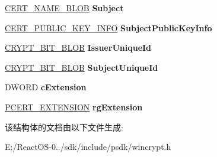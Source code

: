 \begin{DoxyCompactItemize}
\hyperlink{struct___c_r_y_p_t_o_a_p_i___b_l_o_b}{C\+E\+R\+T\+\_\+\+N\+A\+M\+E\+\_\+\+B\+L\+OB} {\bfseries Subject}
\item 
\mbox{\label{struct___c_e_r_t___i_n_f_o_a94044bc448978413437e7eecadebdc6c}} 
\hyperlink{struct___c_e_r_t___p_u_b_l_i_c___k_e_y___i_n_f_o}{C\+E\+R\+T\+\_\+\+P\+U\+B\+L\+I\+C\+\_\+\+K\+E\+Y\+\_\+\+I\+N\+FO} {\bfseries Subject\+Public\+Key\+Info}
\item 
\mbox{\label{struct___c_e_r_t___i_n_f_o_af4152705b0068616b0892478abaedad3}} 
\hyperlink{struct___c_r_y_p_t___b_i_t___b_l_o_b}{C\+R\+Y\+P\+T\+\_\+\+B\+I\+T\+\_\+\+B\+L\+OB} {\bfseries Issuer\+Unique\+Id}
\item 
\mbox{\label{struct___c_e_r_t___i_n_f_o_a6c4c9f8ab6c76878cbb9ae0439f2c734}} 
\hyperlink{struct___c_r_y_p_t___b_i_t___b_l_o_b}{C\+R\+Y\+P\+T\+\_\+\+B\+I\+T\+\_\+\+B\+L\+OB} {\bfseries Subject\+Unique\+Id}
\item 
\mbox{\label{struct___c_e_r_t___i_n_f_o_ae176d129359560fdc7727f434a778c44}} 
D\+W\+O\+RD {\bfseries c\+Extension}
\item 
\mbox{\label{struct___c_e_r_t___i_n_f_o_a0c3ffcc22f46963abae3a22a2a75dc8e}} 
\hyperlink{struct___c_e_r_t___e_x_t_e_n_s_i_o_n}{P\+C\+E\+R\+T\+\_\+\+E\+X\+T\+E\+N\+S\+I\+ON} {\bfseries rg\+Extension}
\end{DoxyCompactItemize}


该结构体的文档由以下文件生成\+:\begin{DoxyCompactItemize}
\item 
E\+:/\+React\+O\+S-\/0../sdk/include/psdk/wincrypt.\+h\end{DoxyCompactItemize}
